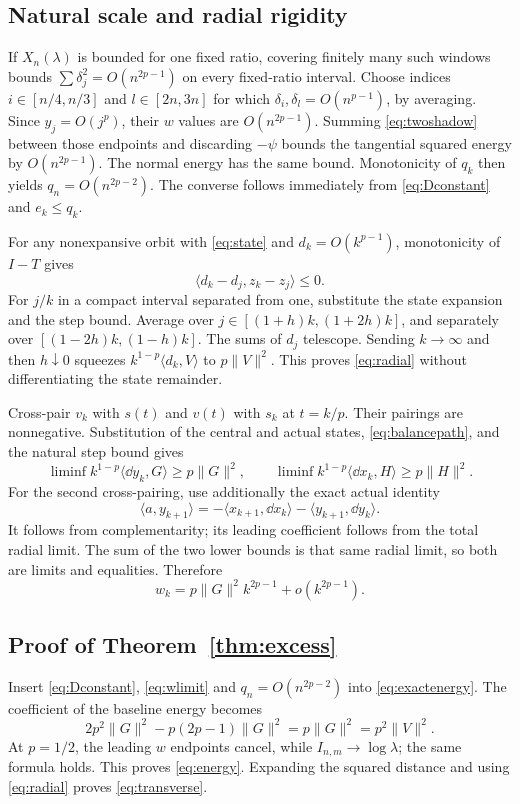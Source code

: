 \documentclass[11pt]{article}
\theoremstyle{remark}\newtheorem{remark}[theorem]{Remark}
\newcommand{\ip}[2]{\langle #1,#2\rangle}\newcommand{\norm}[1]{\lVert #1\rVert}
\numberwithin{equation}{section}
\begin{document}
\subsection{Natural scale and radial rigidity}
If $X_n(\lambda)$ is bounded for one fixed ratio, covering finitely many such windows bounds $\sum\delta_j^2=O(n^{2p-1})$ on every fixed-ratio interval. Choose indices $i\in[n/4,n/3]$ and $l\in[2n,3n]$ for which $\delta_i,\delta_l=O(n^{p-1})$, by averaging. Since $y_j=O(j^p)$, their $w$ values are $O(n^{2p-1})$. Summing \eqref{eq:twoshadow} between those endpoints and discarding $-\psi$ bounds the tangential squared energy by $O(n^{2p-1})$. The normal energy has the same bound. Monotonicity of $q_k$ then yields $q_n=O(n^{2p-2})$. The converse follows immediately from \eqref{eq:Dconstant} and $e_k\leq q_k$.

For any nonexpansive orbit with \eqref{eq:state} and $d_k=O(k^{p-1})$, monotonicity of $I-T$ gives
\[
 \ip{d_k-d_j}{z_k-z_j}\leq0.
\]
For $j/k$ in a compact interval separated from one, substitute the state expansion and the step bound. Average over $j\in[(1+h)k,(1+2h)k]$, and separately over $[(1-2h)k,(1-h)k]$. The sums of $d_j$ telescope. Sending $k\to\infty$ and then $h\downarrow0$ squeezes $k^{1-p}\ip{d_k}{V}$ to $p\norm V^2$. This proves \eqref{eq:radial} without differentiating the state remainder.

Cross-pair $v_k$ with $s(t)$ and $v(t)$ with $s_k$ at $t=k/p$. Their pairings are nonnegative. Substitution of the central and actual states, \eqref{eq:balancepath}, and the natural step bound gives
\[
 \liminf k^{1-p}\ip{\dd y_k}{G}\geq p\norm G^2,\qquad
 \liminf k^{1-p}\ip{\dd x_k}{H}\geq p\norm H^2.
\]
For the second cross-pairing, use additionally the exact actual identity
\[\ip{a}{y_{k+1}}=-\ip{x_{k+1}}{\dd x_k}-\ip{y_{k+1}}{\dd y_k}.\]
It follows from complementarity; its leading coefficient follows from the total radial limit. The sum of the two lower bounds is that same radial limit, so both are limits and equalities. Therefore
\begin{equation}\label{eq:wlimit}
 w_k=p\norm G^2 k^{2p-1}+o(k^{2p-1}).
\end{equation}

\subsection{Proof of Theorem~\ref{thm:excess}}
Insert \eqref{eq:Dconstant}, \eqref{eq:wlimit} and $q_n=O(n^{2p-2})$ into \eqref{eq:exactenergy}. The coefficient of the baseline energy becomes
\[
 2p^2\norm G^2-p(2p-1)\norm G^2=p\norm G^2=p^2\norm V^2.
\]
At $p=1/2$, the leading $w$ endpoints cancel, while $I_{n,m}\to\log\lambda$; the same formula holds. This proves \eqref{eq:energy}. Expanding the squared distance and using \eqref{eq:radial} proves \eqref{eq:transverse}.
\end{document}
